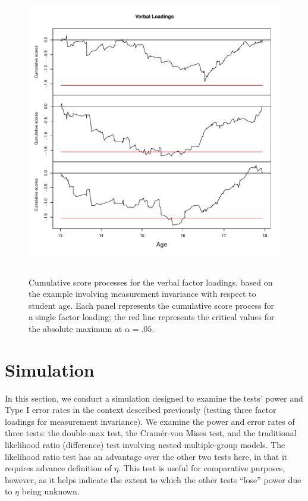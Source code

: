 \documentclass[man]{apa}
\begin{document}
\begin{figure}
\caption{Cumulative score processes for the verbal factor loadings,
  based on the example involving measurement invariance with respect
  to student age.  Each panel represents the cumulative score process
  for a single factor loading; the red line represents the critical values for 
  the absolute maximum at $\alpha=.05$.}
\label{fig:cusumex}
\includegraphics[height=5in]{example.pdf}
\end{figure}

\section{Simulation}
In this section, we conduct a simulation designed to
examine the tests' power and Type I error rates in the context
described previously (testing three factor loadings for measurement
invariance).  We 
examine the power and error rates of three tests: the double-max test, the
Cram\'{e}r-von Mises test, and the traditional likelihood
ratio (difference) test involving nested 
multiple-group models.  The likelihood ratio test has an advantage over the
other two tests here, in that it requires advance definition of
$\eta$.  This test is useful for comparative purposes,
however, as it helps indicate the extent to which the other tests
``lose'' power due to $\eta$ being unknown.
\end{document}
